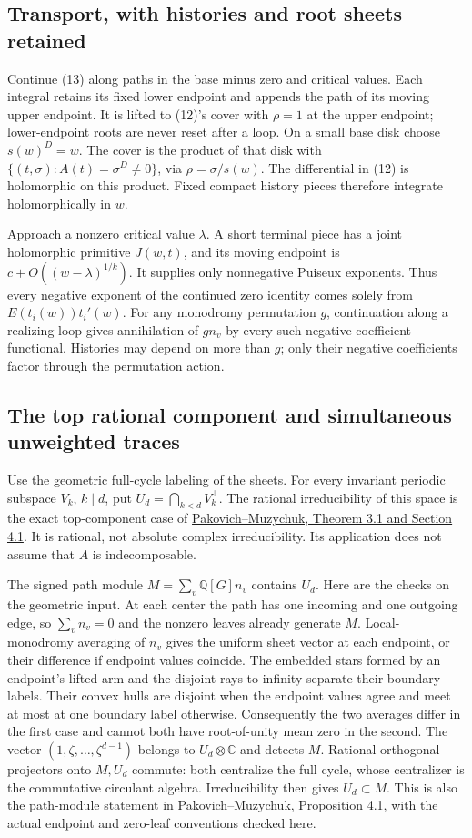 \documentclass[11pt]{article}
\newcommand{\C}{\mathbb C}
\newcommand{\Q}{\mathbb Q}
\begin{document}
\subsection{Transport, with histories and root sheets retained}
Continue (13) along paths in the base minus zero and critical values.
Each integral retains its fixed lower endpoint and appends the path of
its moving upper endpoint. It is lifted to (12)'s cover with $\rho=1$
at the upper endpoint; lower-endpoint roots are never reset after a loop.
On a small base disk choose $s(w)^D=w$. The cover is the product of that
disk with $\{(t,\sigma):A(t)=\sigma^D\ne0\}$, via $\rho=\sigma/s(w)$.
The differential in (12) is holomorphic on this product. Fixed compact
history pieces therefore integrate holomorphically in $w$.

Approach a nonzero critical value $\lambda$. A short terminal piece has
a joint holomorphic primitive $J(w,t)$, and its moving endpoint is
$c+O((w-\lambda)^{1/k})$. It supplies only nonnegative Puiseux exponents.
Thus every negative exponent of the continued zero identity comes solely
from $E(t_i(w))t_i'(w)$. For any monodromy permutation $g$, continuation
along a realizing loop gives annihilation of $g n_v$ by every such
negative-coefficient functional. Histories may depend on more than $g$;
only their negative coefficients factor through the permutation action.

\subsection{The top rational component and simultaneous unweighted traces}
Use the geometric full-cycle labeling of the sheets. For every invariant
periodic subspace $V_k$, $k\mid d$, put
$U_d=\bigcap_{k<d}V_k^\perp$. The rational irreducibility of this space
is the exact top-component case of
\href{https://arxiv.org/html/0710.4085v2}{Pakovich--Muzychuk, Theorem 3.1
and Section 4.1}. It is rational, not absolute complex irreducibility.
Its application does not assume that $A$ is indecomposable.

The signed path module $M=\sum_v\Q[G]n_v$ contains $U_d$.
Here are the checks on the geometric input. At each center the path has
one incoming and one outgoing edge, so $\sum_vn_v=0$ and the nonzero leaves
already generate $M$. Local-monodromy averaging of $n_v$ gives the uniform
sheet vector at each endpoint, or their difference if endpoint values
coincide. The embedded stars formed by an endpoint's lifted arm and the
disjoint rays to infinity separate their boundary labels. Their convex
hulls are disjoint when the endpoint values agree and meet at most at
one boundary label otherwise. Consequently the two averages differ in
the first case and cannot both have root-of-unity mean zero in the second.
The vector $(1,\zeta,\ldots,\zeta^{d-1})$ belongs to $U_d\otimes\C$ and
detects $M$. Rational orthogonal projectors onto $M,U_d$ commute: both
centralize the full cycle, whose centralizer is the commutative circulant
algebra. Irreducibility then gives $U_d\subset M$. This is also the
path-module statement in Pakovich--Muzychuk, Proposition 4.1, with the
actual endpoint and zero-leaf conventions checked here.
\end{document}
